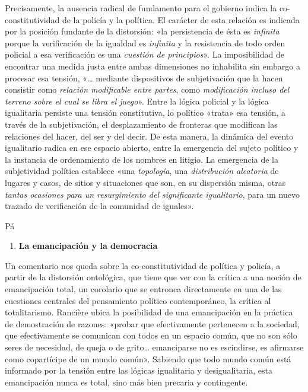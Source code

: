 Precisamente, la ausencia radical de fundamento para el gobierno indica la co-constitutividad de la policía y la política. El carácter de esta relación es indicada por la posición fundante de la distorsión: «la persistencia de ésta es \emph{infinita} porque la verificación de la igualdad es \emph{infinita} y la resistencia de todo orden policial a esa verificación es una \emph{cuestión de principios}». La imposibilidad de encontrar una medida justa entre ambas dimensiones no inhabilita sin embargo a procesar esa tensión, «\ldots{} mediante dispositivos de subjetivación que la hacen consistir como \emph{relación modificable entre partes}, como \emph{modificación incluso del terreno sobre el cual se libra el juego}». Entre la lógica policial y la lógica igualitaria persiste una tensión constitutiva, lo político «trata» esa tensión, a través de la subjetivación, el desplazamiento de fronteras que modifican las relaciones del hacer, del ser y del decir. De esta manera, la dinámica del evento igualitario radica en ese espacio abierto, entre la emergencia del sujeto político y la instancia de ordenamiento de los nombres en litigio. La emergencia de la subjetividad política establece «una \emph{topología}, una \emph{distribución aleatoria} de lugares y casos, de sitios y situaciones que son, en su dispersión misma, otras \emph{tantas ocasiones para un resurgimiento del significante igualitario}, para un nuevo trazado de verificación de la comunidad de iguales».

Pá

\begin{enumerate}
\def\labelenumi{\arabic{enumi}.}
\item
  \textbf{La emancipación y la democracia}
\end{enumerate}

Un comentario nos queda sobre la co-constitutividad de política y policía, a partir de la distorsión ontológica, que tiene que ver con la crítica a una noción de emancipación total, un corolario que se entronca directamente en una de las cuestiones centrales del pensamiento político contemporáneo, la crítica al totalitarismo. Rancière ubica la posibilidad de una emancipación en la práctica de demostración de razones: «probar que efectivamente pertenecen a la sociedad, que efectivamente se comunican con todos en un espacio común, que no son sólo seres de necesidad, de queja o de grito\ldots{} emanciparse no es escindirse, es afirmarse como copartícipe de un mundo común». Sabiendo que todo mundo común está informado por la tensión entre las lógicas igualitaria y desigualitaria, esta emancipación nunca es total, sino más bien precaria y contingente.

